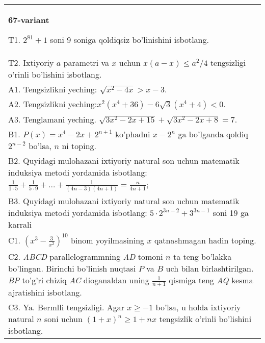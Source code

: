 \documentclass{article}
\begin{document}
\begin{tabular}{m{17cm}}
\textbf{67-variant}
\newline

T1. \(2^{81} + 1\) soni 9 soniga qoldiqsiz bo'linishini isbotlang. \\
T2. Ixtiyoriy \(a\) parametri va \(x\) uchun \(x(a - x) \leq a^{2}/4\) tengsizligi o'rinli bo'lishini isbotlang. \\
A1. Tengsizlikni yeching: \(\sqrt{x^{2} - 4x} > x - 3\). \\
A2. Tengsizlikni yeching:\(x^{2}\left( x^{4} + 36 \right) - 6\sqrt{3}\left( x^{4} + 4 \right) < 0\). \\
A3. Tenglamani yeching. \(\sqrt{3x^{2} - 2x + 15} + \sqrt{3x^{2} - 2x + 8} = 7\). \\
B1. \(P(x) = x^{4} - 2x + 2^{n + 1}\) ko'phadni \(x - 2^{n}\) ga bo'lganda qoldiq \(2^{n - 2}\) bo'lsa, \(n\) ni toping. \\
B2. Quyidagi mulohazani ixtiyoriy natural son uchun matematik induksiya metodi yordamida isbotlang: \(\frac{1}{1 \cdot 5} + \frac{1}{5 \cdot 9} + ... + \frac{1}{(4n - 3)(4n + 1)} = \frac{n}{4n + 1}\); \\
B3. Quyidagi mulohazani ixtiyoriy natural son uchun matematik induksiya metodi yordamida isbotlang: \(5 \cdot 2^{3n - 2} + 3^{3n - 1}\) soni 19 ga karrali \\
C1. \(\left( x^{3} - \frac{3}{x^{2}} \right)^{10}\) binom yoyilmasining \(x\) qatnashmagan hadin toping. \\
C2. \emph{ABCD} parallelogrammning \emph{AD} tomoni \(n\) ta teng bo'lakka bo'lingan. Birinchi bo'linish nuqtasi \(P\) va \(B\) uch bilan birlashtirilgan. \emph{BP} to'g'ri chiziq \emph{AC} dioganaldan uning \(\frac{1}{n + 1}\) qismiga teng \emph{AQ} kesma ajratishini isbotlang. \\
C3. Ya. Bermlli tengsizligi. Agar \(x \geq - 1\) bo'lsa, u holda ixtiyoriy natural \(n\) soni uchun \((1 + x)^{n} \geq 1 + nx\) tengsizlik o'rinli bo'lishini isbotlang. \\

\end{tabular}
\vspace{1cm}
\end{document}
